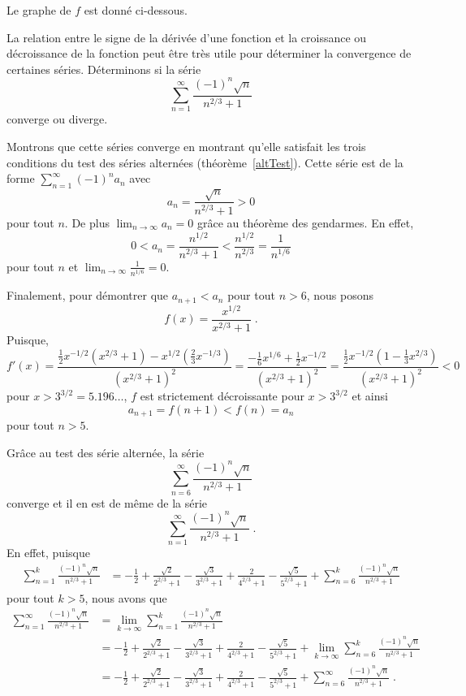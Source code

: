 {\begin{egg}
Le graphe de $f$ est donné ci-dessous.
\end{egg}

\begin{egg}[\eng]
La relation entre le signe de la dérivée d'une fonction et la
croissance ou décroissance de la fonction peut être très utile pour
déterminer la convergence de certaines séries.  Déterminons si la
série
\[
\sum_{n=1}^\infty \frac{(-1)^n\sqrt{n}}{n^{2/3}+1}
\]
converge ou diverge.

Montrons que cette séries converge en montrant qu'elle satisfait
les trois conditions du test des séries alternées
(théorème~\ref{altTest}).  Cette série est de la forme
$\displaystyle \sum_{n=1}^\infty (-1)^n a_n$ avec 
\[
a_n = \frac{\sqrt{n}}{n^{2/3}+1} > 0
\]
pour tout $n$.  De plus $\displaystyle \lim_{n\rightarrow \infty} a_n = 0$
grâce au théorème des gendarmes.  En effet,
\[
0 < a_n = \frac{n^{1/2}}{n^{2/3}+1} < \frac{n^{1/2}}{n^{2/3}} =
\frac{1}{n^{1/6}}
\]
pour tout $n$ et
$\displaystyle \lim_{n\rightarrow \infty} \frac{1}{n^{1/6}} = 0$.

Finalement, pour démontrer que $a_{n+1} < a_n$ pour tout $n>6$, nous posons
\[
f(x) = \frac{x^{1/2}}{x^{2/3}+1} \; .
\]
Puisque,
\[
f'(x) = \frac{\frac{1}{2}x^{-1/2}(x^{2/3}+1) - x^{1/2}(\frac{2}{3}x^{-1/3})}
{(x^{2/3}+1)^2} =
\frac{-\frac{1}{6} x^{1/6} + \frac{1}{2} x^{-1/2}}{(x^{2/3}+1)^2} =
\frac{\frac{1}{2} x^{-1/2}(1-\frac{1}{3}x^{2/3})}{(x^{2/3}+1)^2} < 0
\]
pour $x> 3^{3/2} = 5.196\ldots$, $f$ est strictement décroissante pour
$x>3^{3/2}$ et ainsi
\[
a_{n+1} = f(n+1) < f(n) = a_n
\]
pour tout $n>5$.

Grâce au test des série alternée, la série
\[
\sum_{n=6}^\infty \frac{(-1)^n\sqrt{n}}{n^{2/3}+1}
\]
converge et il en est de même de la série
\[
\sum_{n=1}^\infty \frac{(-1)^n\sqrt{n}}{n^{2/3}+1} \; .
\]
En effet, puisque
\begin{align*}
\sum_{n=1}^k \frac{(-1)^n\sqrt{n}}{n^{2/3}+1}
&= -\frac{1}{2} + \frac{\sqrt{2}}{2^{2/3}+1} 
- \frac{\sqrt{3}}{3^{2/3}+1} + \frac{2}{4^{2/3}+1} -
\frac{\sqrt{5}}{5^{2/3}+1}
+ \sum_{n=6}^k \frac{(-1)^n\sqrt{n}}{n^{2/3}+1}
\end{align*}
pour tout $k>5$, nous avons que
\begin{align*}
\sum_{n=1}^\infty \frac{(-1)^n\sqrt{n}}{n^{2/3}+1}
&= \lim_{k\rightarrow \infty} \sum_{n=1}^k \frac{(-1)^n\sqrt{n}}{n^{2/3}+1} \\
&= -\frac{1}{2} + \frac{\sqrt{2}}{2^{2/3}+1} 
- \frac{\sqrt{3}}{3^{2/3}+1} + \frac{2}{4^{2/3}+1} -
\frac{\sqrt{5}}{5^{2/3}+1}
+ \lim_{k\rightarrow \infty} \sum_{n=6}^k
\frac{(-1)^n\sqrt{n}}{n^{2/3}+1} \\
&= -\frac{1}{2} + \frac{\sqrt{2}}{2^{2/3}+1} 
- \frac{\sqrt{3}}{3^{2/3}+1} + \frac{2}{4^{2/3}+1} -
\frac{\sqrt{5}}{5^{2/3}+1}
+\sum_{n=6}^\infty \frac{(-1)^n\sqrt{n}}{n^{2/3}+1} \; .
\end{align*}
\end{egg}

}

